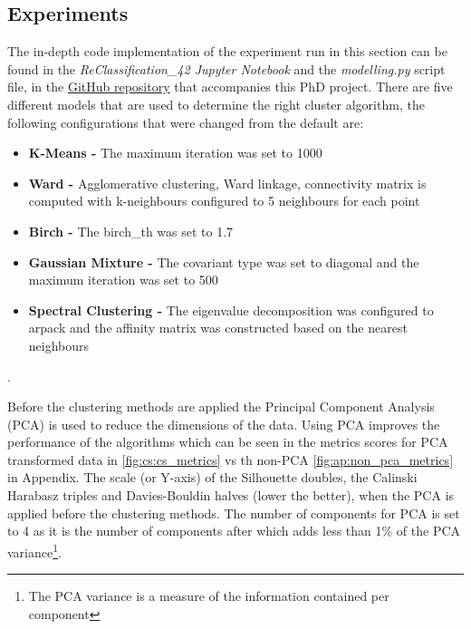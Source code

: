 \subsection{Experiments} 

The in-depth code implementation of the experiment run in this section can be found in the \textit{ReClassification\_42 Jupyter Notebook} and the\textit{ modelling.py} script file, in the \href{https://github.com/vladUng/Phd_thesis_exp}{GitHub repository} that accompanies this PhD project. There are five different models that are used to determine the right cluster algorithm, the following configurations that were changed from the default are: 
\begin{itemize}
    \item \textbf{K-Means -} The maximum iteration was set to 1000
    \item \textbf{Ward -} Agglomerative clustering, Ward linkage, connectivity matrix is computed with k-neighbours configured to 5 neighbours for each point
    \item \textbf{Birch -} The birch\_th was set to 1.7
    \item \textbf{Gaussian Mixture -} The covariant type was set to diagonal and the maximum iteration was set to 500
    \item \textbf{Spectral Clustering -} The eigenvalue decomposition was configured to arpack and the affinity matrix was constructed based on the nearest neighbours
\end{itemize}. 

Before the clustering methods are applied the Principal Component Analysis (PCA) is used to reduce the dimensions of the data. Using PCA improves the performance of the algorithms which can be seen in the metrics scores for PCA transformed data in \cref{fig:cs:cs_metrics} vs th non-PCA \cref{fig:ap:non_pca_metrics} in Appendix. The scale (or Y-axis) of the Silhouette doubles, the Calinski Harabasz triples and Davies-Bouldin halves (lower the better), when the PCA is applied before the clustering methods. The number of components for PCA is set to 4 as it is the number of components after which adds less than 1\% of the PCA variance\footnote{The PCA variance is a measure of the information contained per component}.

